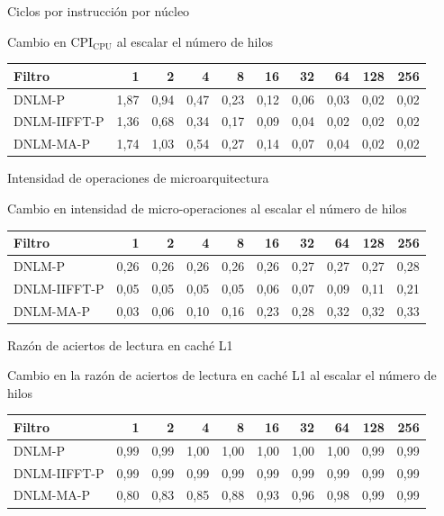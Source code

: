 \documentclass[15pt]{beamer} %
\begin{document}
\begin{frame}{Ciclos por instrucción por núcleo}
  
  \begin{center}
   \setlength\tabcolsep{2.5pt}
   \setlength{\textfloatsep}{25mm}
    {\footnotesize Cambio en $\text{CPI}_{\text{CPU}}$ al escalar el n\'umero de hilos}
    \begin{tabular}{lrrrrrrrrr}
	 Filtro & 1 & 2 & 4 & 8 & 16 & 32 & 64 & 128 & 256 \tabularnewline
	\hline
	DNLM-P & 1,87 & 0,94 & 0,47 & 0,23 & 0,12 & 0,06 & 0,03 & 0,02 & 0,02 \tabularnewline
	DNLM-IIFFT-P & 1,36 & 0,68 & 0,34 & 0,17 & 0,09 & 0,04 & 0,02 & 0,02 & 0,02 \tabularnewline
	DNLM-MA-P & 1,74 & 1,03 & 0,54 & 0,27 & 0,14 & 0,07 & 0,04 & 0,02 & 0,02 \tabularnewline
	\end{tabular}
  \end{center}
\end{frame}

\begin{frame}{Intensidad de operaciones de microarquitectura}
  
  \begin{center}
  \setlength\tabcolsep{2.5pt}
   \setlength{\textfloatsep}{25mm}
    {\footnotesize Cambio en intensidad de  micro-operaciones al escalar el n\'umero de hilos}
    \begin{tabular}{lrrrrrrrrr}
	 Filtro & 1 & 2 & 4 & 8 & 16 & 32 & 64 & 128 & 256 \tabularnewline
	\hline
	DNLM-P & 0,26 & 0,26 & 0,26 & 0,26 & 0,26 & 0,27 & 0,27 & 0,27 & 0,28 \tabularnewline
	DNLM-IIFFT-P & 0,05 & 0,05 & 0,05 & 0,05 & 0,06 & 0,07 & 0,09 & 0,11 & 0,21 \tabularnewline
	DNLM-MA-P & 0,03 & 0,06 & 0,10 & 0,16 & 0,23 & 0,28 & 0,32 & 0,32 & 0,33 \tabularnewline
	\end{tabular}
  \end{center}
\end{frame}


\begin{frame}{Raz\'on de aciertos de lectura en cach\'e L1}
  
  \begin{center}
  \setlength\tabcolsep{2.5pt}
   \setlength{\textfloatsep}{25mm}
    {\footnotesize Cambio en la raz\'on de aciertos de lectura en cach\'e L1 al escalar el n\'umero de hilos}
    \begin{tabular}{lrrrrrrrrr}
	 Filtro & 1 & 2 & 4 & 8 & 16 & 32 & 64 & 128 & 256 \tabularnewline
	\hline
	DNLM-P & 0,99 & 0,99 & 1,00 & 1,00 & 1,00 & 1,00 & 1,00 & 0,99 & 0,99 \tabularnewline
	DNLM-IIFFT-P & 0,99 & 0,99 & 0,99 & 0,99 & 0,99 & 0,99 & 0,99 & 0,99 & 0,99 \tabularnewline
	DNLM-MA-P & 0,80 & 0,83 & 0,85 & 0,88 & 0,93 & 0,96 & 0,98 & 0,99 & 0,99 \tabularnewline
	\end{tabular}
  \end{center}
\end{frame}
\end{document}

